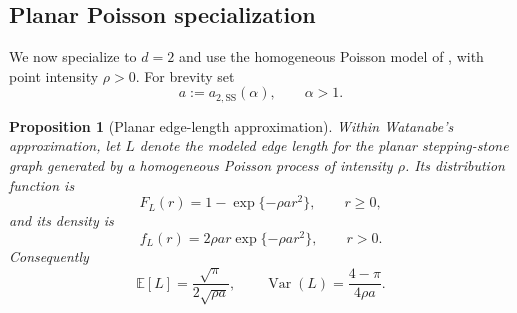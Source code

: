 \documentclass[a4paper,fleqn]{cas-dc}
\newtheorem{proposition}{Proposition}
\theoremstyle{definition}
\theoremstyle{remark}
\newcommand{\E}{\mathds{E}}
\newcommand{\0}{\mathbf{0}}
\begin{document}
\subsection{Planar Poisson specialization}

We now specialize to $d=2$ and use the homogeneous Poisson model of
\citet{watanabe2008evaluating}, with point intensity $\rho>0$. For brevity set
\begin{equation}
    a:=a_{2,\mathrm{SS}}(\alpha),
    \qquad \alpha>1.
\end{equation}

\begin{proposition}[Planar edge-length approximation]
\label{prop:poisson-edge-density}
Within Watanabe's approximation, let \(L\) denote the
modeled edge length for the planar stepping-stone graph generated by a
homogeneous Poisson process of intensity \(\rho\). Its distribution function
is
\begin{equation}\label{eq:watanabe-cdf}
    F_L(r)=1-\exp\{-\rho a r^2\},
    \qquad r\geq0,
\end{equation}
and its density is
\begin{equation}\label{eq:watanabe-density}
    f_L(r)
    =
    2\rho a r\exp\{-\rho a r^2\},
    \qquad r>0.
\end{equation}
Consequently
\begin{equation}\label{eq:watanabe-moments}
    \E[L]=\frac{\sqrt{\pi}}{2\sqrt{\rho a}},
    \qquad
    \operatorname{Var}(L)=\frac{4-\pi}{4\rho a}.
\end{equation}
\end{proposition}
\end{document}
